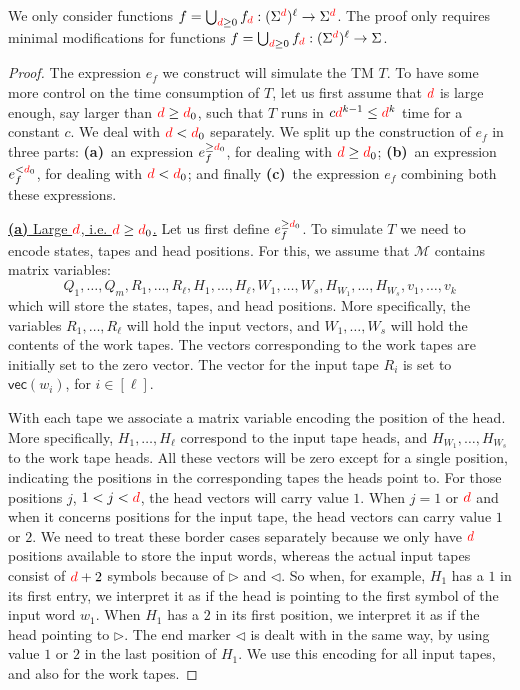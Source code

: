 We only consider functions $f=\bigcup_{{\color{red} d}\geq 0}f_{\color{red} d}:(\Sigma^{\color{red} d})^\ell\to \Sigma^{\color{red} d}$. The proof only requires
minimal modifications for functions  $f=\bigcup_{{\color{red} d}\geq 0}f_{\color{red} d}:(\Sigma^{\color{red} d})^\ell\to \Sigma$.

\begin{proof}
	The expression $e_f$ we construct will simulate the TM $T$. To have some more control on the time consumption of $T$, let us first assume that ${\color{red} d}$ is large enough, say larger than ${\color{red} d}\geq {\color{red} d}_0$, 
	such that $T$ runs in $c{\color{red} d}^{k-1}\leq {\color{red} d}^{k}$ time for a constant $c$. We deal with ${\color{red} d}<{\color{red} d}_0$ separately.
 We split up the construction of $e_f$ in three
	parts: \textbf{(a)}~an expression $e_f^{\geq {\color{red} d}_0}$, for dealing with ${\color{red} d}\geq {\color{red} d}_0$; \textbf{(b)}~an expression
	$e_f^{<{\color{red} d}_0}$, for dealing with ${\color{red} d}<{\color{red} d}_0$; and finally \textbf{(c)}~the expression $e_f$ combining both these expressions. 

\medskip
\noindent
\underline{\textbf{(a)} Large ${\color{red} d}$, i.e. ${\color{red} d}\geq {\color{red} d}_0$.}
    Let us first define $e_f^{\geq {\color{red} d}_0}$. To simulate $T$ we need to encode states, tapes and head positions. For this, we assume that $\mathcal{M}$ contains matrix variables:
    $$
    Q_1,\ldots,Q_m, R_1,\ldots,R_\ell, H_1,\ldots,H_\ell, W_1,\ldots,W_s, H_{W_1},\ldots,H_{W_s}, v_1,\ldots,v_{k}
    $$
    which will store the states, tapes, and head positions. More specifically, the variables 
    $R_1,\ldots,R_\ell$ will hold the input vectors, and $W_1,\ldots,W_s$ will hold the contents of the work
    tapes.
	The vectors corresponding to the work tapes are initially set to the zero vector. 
    The vector for the input tape $R_i$ is set to $\mathsf{vec}(w_i)$, for $i\in[\ell]$.

\smallskip
    With each tape we associate a matrix variable encoding the position of the head. More specifically, 
    $H_1,\ldots,H_\ell$ correspond to the input tape heads, and
    $H_{W_1},\ldots, H_{W_s}$ to the work tape heads.
    All these vectors will be zero except 
    for a single position, indicating the positions in the corresponding tapes the heads point to. 
    For those positions $j$, $1<j<{\color{red} d}$, the head vectors will carry value $1$.  When $j=1$ or ${\color{red} d}$ and when 
    it concerns positions for the input tape, the head vectors can carry value $1$ or $2$. We need to treat 
    these border cases separately
    because we only have ${\color{red} d}$ positions available to store the input words, whereas the actual input tapes 
    consist of ${\color{red} d}+2$ symbols because of $\rhd$ and $\lhd$. So when, for example, $H_1$ has a $1$ in its first
    entry, we interpret it as if the head is pointing to the first symbol of the input word $w_1$. When $H_1$
    has a $2$ in its first position, we interpret it as if the head pointing to $\rhd$. The end marker $\lhd$ is
    dealt with in the same way, by using value $1$ or $2$ in the last position of $H_1$. We use this encoding
    for all input tapes, and also for the work tapes.
    


\end{proof}
